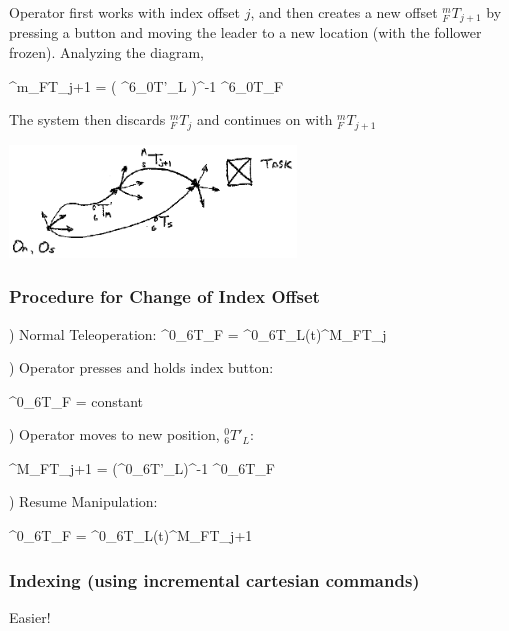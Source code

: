  Operator first works with index offset $j$, and then creates a new offset $^m_FT_{j+1}$ by pressing a button and moving the leader to a new location (with the follower frozen).  Analyzing the diagram, 	%

\bq
^m_FT_{j+1} = \left ( ^6_0T'_L \right )^{-1} {^6_0T_F}
\eq


The system then discards $^m_FT_j$ and continues on with $^m_FT_{j+1}$

\includegraphics[width=3.0in]{figs14/00407.eps}

\subsubsection{Procedure for Change of Index Offset}

) Normal Teleoperation:
\bq
^0_6T_F = ^0_6T_L(t)^M_FT_j
\eq

) Operator presses and holds index button:


\bq
{} \qquad ^0_6T_F = constant
\eq

) Operator moves to new position, $^0_6T'_L$:

\bq
^M_FT_{j+1} = \left (^0_6T'_L\right )^{-1} {^0_6T_F}
\eq

) Resume Manipulation:

\bq
^0_6T_F = ^0_6T_L(t)^M_FT_{j+1}
\eq





\subsubsection{Indexing (using incremental cartesian commands)}

Easier!


